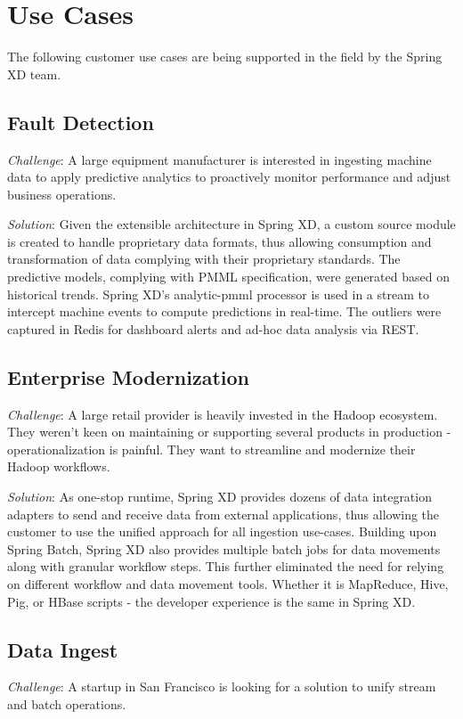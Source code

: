 \section{Use Cases}
\label{sec:Use Cases}

The following customer use cases are being supported in the field by the
Spring XD team.

\subsection{Fault Detection}
\textit{Challenge}: A large equipment manufacturer is interested in
ingesting machine data to apply predictive analytics to proactively monitor
performance and adjust business operations.

\textit{Solution}: Given the extensible architecture in Spring XD, a custom
source module is created to handle proprietary data formats, thus allowing
consumption and transformation of data complying with their proprietary
standards. The predictive models, complying with PMML specification, were
generated based on historical trends. Spring XD's analytic-pmml processor is
used in a stream to intercept machine events to compute predictions in
real-time. The outliers were captured in Redis for dashboard alerts 
and ad-hoc data analysis via REST.

\subsection{Enterprise Modernization}
\textit{Challenge}: A large retail provider is heavily invested in the Hadoop
ecosystem. They weren't keen on maintaining or supporting several products in
production - operationalization is painful. They want to streamline and
modernize their Hadoop workflows.

\textit{Solution}: As one-stop runtime, Spring XD provides dozens of data
integration adapters to send and receive data from external applications, thus
allowing the customer to use the unified approach for all ingestion use-cases.
Building upon Spring Batch, Spring XD also provides multiple batch jobs for data movements along with granular workflow steps. This further eliminated the need for relying on different workflow and data movement tools. Whether it is MapReduce, Hive, Pig, or HBase scripts - the developer experience is the same in Spring XD.

\subsection{Data Ingest}
\textit{Challenge}: A startup in San Francisco is looking for a solution to
unify stream and batch operations. 

